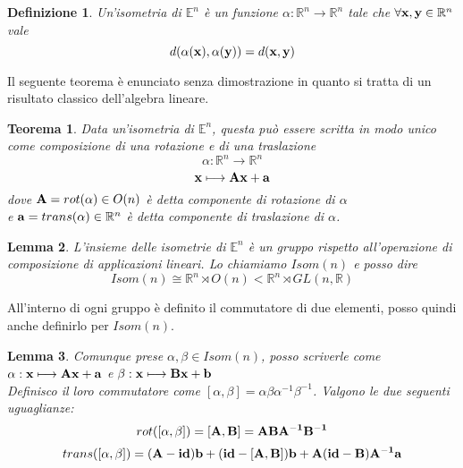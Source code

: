 \documentclass[10pt,a4paper]{book}
\newtheorem{definition}{Definizione}[section]
\newtheorem{theorem}{Teorema}[section]
\newtheorem{lemma}[theorem]{Lemma}
\begin{document}
\begin{definition}
	Un'isometria di $\mathbb{E}^n$  è un funzione $ \alpha : \mathbb{R}^{n} \longrightarrow \mathbb{R}^{n} $  tale che $\forall \vb{x,y} \in \mathbb{R}^n $ vale 
	\[ d(\alpha(\vb{x}), \alpha(\vb{y})) = d(\vb{x} , \vb{y} )\]
\end{definition} 
Il seguente teorema è enunciato senza dimostrazione in quanto si tratta di un risultato classico dell'algebra lineare. 
\begin{theorem}
Data un'isometria di $\mathbb{E}^n $, questa può essere scritta in modo unico come composizione di una rotazione e di una traslazione
\[ \alpha : \mathbb{R}^{n} \longrightarrow \mathbb{R}^{n} \]
\[\vb{x} \longmapsto \vb{Ax + a} \]
dove $\vb{A} = rot( \alpha ) \in O(n) $ è detta componente di rotazione di $\alpha$ \\
e $\vb{a} = trans( \alpha ) \in \mathbb{R}^{n} $ è detta componente di traslazione di $\alpha$. 
\end{theorem}
\begin{lemma}
L'insieme delle isometrie di  $\mathbb{E}^{n} $  è un gruppo rispetto all'operazione di composizione di applicazioni lineari. Lo chiamiamo $Isom(n)$ e posso dire
\[ Isom(n) \cong \mathbb{R}^{n} \rtimes O(n) < \mathbb{R}^{n} \rtimes GL(n, \mathbb{R})
\]
\end{lemma}
All'interno di ogni gruppo è definito il commutatore di due elementi, posso quindi anche definirlo per $Isom(n)$.
\begin{lemma}
	Comunque prese  $ \alpha , \beta \in Isom(n)$, posso scriverle come $\alpha : \vb{x} \longmapsto \vb{Ax + a}$ e $\beta : \vb{x} \longmapsto \vb{Bx + b}$ \\
	Definisco il loro commutatore come  $ [ \alpha , \beta] = \alpha \beta \alpha^{-1} \beta^{-1}$. 
Valgono le due seguenti uguaglianze:
\begin{equation}
rot([ \alpha	, \beta ]) = \vb{[A, B]} = \vb{ABA^{-1}B^{-1}}
\end{equation}  
\begin{equation}
trans([ \alpha	, \beta ]) = \vb{(A-id)b+(id-[A,B])b+A(id-B)A^{-1}a }
\end{equation} 
\end{lemma}
\end{document}
